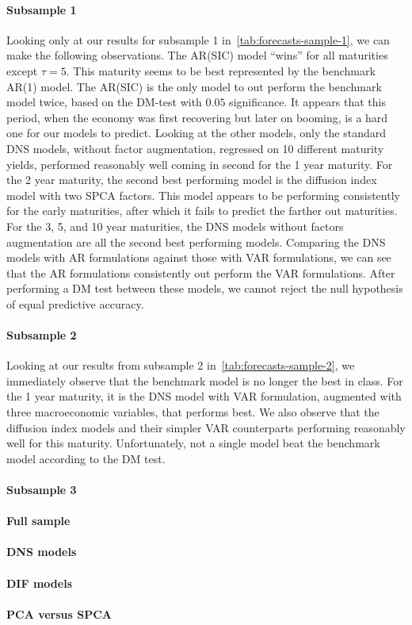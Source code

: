 \paragraph{Subsample 1}
Looking only at our results for subsample 1 in~\cref{tab:forecasts-sample-1}, we can make the following observations. 
The AR(SIC) model \enquote{wins} for all maturities except $\tau = 5$. 
This maturity seems to be best represented by the benchmark AR(1) model.
The AR(SIC) is the only model to out perform the benchmark model twice, based on the DM-test with $0.05$ significance. 
It appears that this period, when the economy was first recovering but later on booming, is a hard one for our models to predict. 
Looking at the other models, only the standard DNS models, without factor augmentation, regressed on 10 different maturity yields, performed reasonably well coming in second for the 1 year maturity. 
For the 2 year maturity, the second best performing model is the diffusion index model with two SPCA factors. 
This model appears to be performing consistently for the early maturities, after which it fails to predict the farther out maturities. 
For the 3, 5, and 10 year maturities, the DNS models without factors augmentation are all the second best performing models. 
Comparing the DNS models with AR formulations against those with VAR formulations, we can see that the AR formulations consistently out perform the VAR formulations. 
After performing a DM test between these models, we cannot reject the null hypothesis of equal predictive accuracy. 

\paragraph{Subsample 2}
Looking at our results from subsample 2 in~\cref{tab:forecasts-sample-2}, we immediately observe that the benchmark model is no longer the best in class. 
For the 1 year maturity, it is the DNS model with VAR formulation, augmented with three macroeconomic variables, that performs best. 
We also observe that the diffusion index models and their simpler VAR counterparts performing reasonably well for this maturity. 
Unfortunately, not a single model beat the benchmark model according to the DM test. 



\paragraph{Subsample 3}


\paragraph{Full sample}


\paragraph{DNS models}


\paragraph{DIF models}


\paragraph{PCA versus SPCA}

